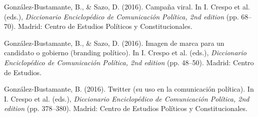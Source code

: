 \begin{publications}
\begin{benumerate}{12}

\item{González-Bustamante, B., \& Sazo, D. (2016). Campaña viral. In I. Crespo et al. (eds.), {\itshape Diccionario Enciclopédico de Comunicación Política, 2nd edition} (pp. 68--70). Madrid: Centro de Estudios Políticos y Constitucionales.}\vspace{1mm}


\item{González-Bustamante, B., \& Sazo, D. (2016). Imagen de marca para un candidato o gobierno (branding político). In I. Crespo et al. (eds.), {\itshape Diccionario Enciclopédico de Comunicación Política, 2nd edition} (pp. 48--50). Madrid: Centro de Estudios.}\vspace{1mm}


\item{González-Bustamante, B. (2016). Twitter (su uso en la comunicación política). In I. Crespo et al. (eds.), {\itshape Diccionario Enciclopédico de Comunicación Política, 2nd edition} (pp. 378--380). Madrid: Centro de Estudios Políticos y Constitucionales.}\vspace{1mm}



\end{benumerate}
\end{publications}
